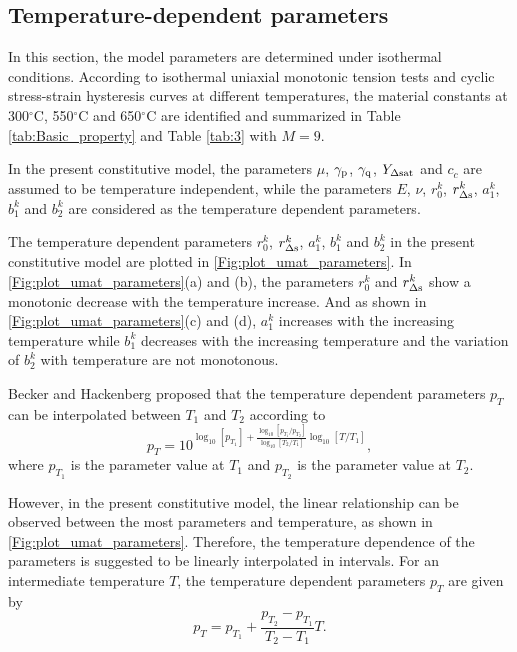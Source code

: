 \documentclass[preprint,5p,twocolumn,11pt,sort&compress]{elsarticle}
\begin{document}
\subsection{Temperature-dependent parameters}
\noindent
In this section, the model parameters are determined under isothermal conditions.
According to isothermal uniaxial monotonic tension tests and  cyclic stress-strain hysteresis curves at different temperatures, the material constants at 300$^{\circ}$C, 550$^{\circ}$C and 650$^{\circ}$C are identified and summarized in Table \ref{tab:Basic_property} and Table \ref{tab:3} with $M=9$. 

In the present constitutive model, the parameters $\mu$, $\gamma_{\rm{p}}$, $\gamma_{\rm{q}}$, $Y_{\Delta {\rm{sat}}}$ and $c_c$ are assumed to be temperature independent, while the parameters $E$, $\nu$, $r_0^k$, $r_{\Delta \rm{s}}^k$, $a_1^k$, $b_1^k$ and $b_2^k$ are considered as the temperature dependent parameters.

The temperature dependent parameters $r_0^k$, $r_{\Delta \rm{s}}^k$, $a_1^k$, $b_1^k$ and $b_2^k$ in the present constitutive model are plotted in \ref{Fig:plot_umat_parameters}. In \ref{Fig:plot_umat_parameters}(a) and (b), the parameters $r_0^k$ and $r_{\Delta \rm{s}}^k$ show a monotonic decrease with the temperature increase. And as shown in \ref{Fig:plot_umat_parameters}(c) and (d), $a_1^k$ increases with the increasing temperature while $b_1^k$ decreases with the increasing temperature and the variation of $b_2^k$ with temperature are not monotonous.

Becker and Hackenberg \cite{Becker2011596} proposed that the temperature dependent parameters $p_T$ can be interpolated between $T_1$ and $T_2$ according to
\[p_T = {10^{{{\log }_{10}}\left[ {{p_{{T_1}}}} \right] + \frac{{{{\log }_{10}}\left[ {{p_{{T_1}}}/{p_{{T_2}}}} \right]}}{{{{\log }_{10}}\left[ {{T_2}/{T_1}} \right]}}{{\log }_{10}}\left[ {T/{T_1}} \right]}},\]
where ${{p_{{T_1}}}}$ is the parameter value at $T_1$ and ${{p_{{T_2}}}}$ is the parameter value at $T_2$.

However, in the present constitutive model, the linear relationship can be observed between the most parameters and temperature, as shown in \ref{Fig:plot_umat_parameters}. Therefore, the temperature dependence of the parameters is suggested to be linearly interpolated in intervals. For an intermediate temperature $T$, the temperature dependent parameters $p_T$ are given by
\[{p_T} = {p_{{T_1}}} + \frac{{{p_{{T_2}}} - {p_{{T_1}}}}}{{{T_2} - {T_1}}}{T}.\]
\end{document}
